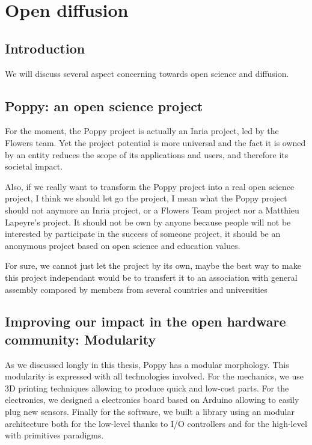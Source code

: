 
\cleartoleftpage


\chapter{Open diffusion} %


\section{Introduction} %



We will discuss several aspect concerning towards open science and diffusion.




\section{Poppy: an open science project}

For the moment, the Poppy project is actually an Inria project, led by the Flowers team. Yet the project potential is more universal and the fact it is owned by an entity reduces the scope of its applications and users, and therefore its societal impact.


Also, if we really want to transform the Poppy project into a real open science project, I think we should let go the project, I mean what the Poppy project should not anymore an Inria project, or a Flowers Team project nor a Matthieu Lapeyre's project. It should not be own by anyone because people will not be interested by participate in the success of someone project, it should be an anonymous project based on open science and education values.


For sure, we cannot just let the project by its own, maybe the best way to make this project independant would be to transfert it to an association with general assembly composed by members from several countries and universities



\section{Improving our impact in the open hardware community: Modularity} %

As we discussed longly in this thesis, Poppy has a modular morphology. This modularity is expressed with all technologies involved. For the mechanics, we use 3D printing techniques allowing to produce quick and low-cost parts. For the electronics, we designed a electronics board based on Arduino allowing to easily plug new sensors. Finally for the software, we built a library using an modular architecture both for the low-level thanks to I/O controllers and for the high-level with primitives paradigms.

